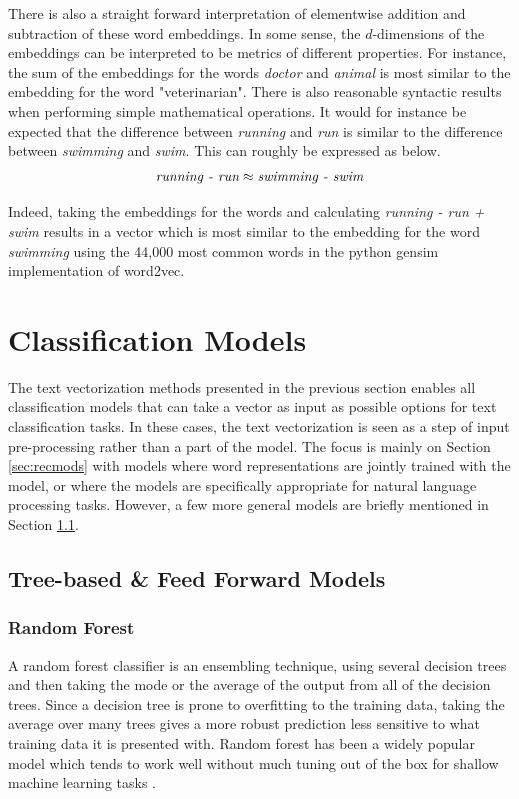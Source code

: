 There is also a straight forward interpretation of elementwise addition and subtraction of these word embeddings. In some sense, the $d$-dimensions of the embeddings can be interpreted to be metrics of different properties. For instance, the sum of the embeddings for the words \emph{doctor} and \emph{animal} is most similar to the embedding for the word "veterinarian". There is also reasonable syntactic results when performing simple mathematical operations. It would for instance be expected that the difference between \emph{running} and \emph{run} is similar to the difference between \emph{swimming} and \emph{swim}. This can roughly be expressed as below. 
\begin{align}
    \emph{running - run} \approx  \emph{swimming - swim}
\end{align}

Indeed, taking the embeddings for the words and calculating \emph{running - run + swim} results in a vector which is most similar to the embedding for the word \emph{swimming} using the 44,000 most common words in the python gensim implementation of word2vec.


\section{Classification Models}

The text vectorization methods presented in the previous section enables all classification models that can take a vector as input as possible options for text classification tasks. In these cases, the text vectorization is seen as a step of input pre-processing rather than a part of the model. The focus is mainly on Section \ref{sec:recmods} with models where word representations are jointly trained with the model, or where the models are specifically appropriate for natural language processing tasks. However, a few more general models are briefly mentioned in Section \ref{sec:treeff}. 

\subsection{Tree-based \& Feed Forward Models}\label{sec:treeff} 

\subsubsection*{Random Forest}

A random forest classifier is an ensembling technique, using several decision trees and then taking the mode or the average of the output from all of the decision trees. Since a decision tree is prone to overfitting to the training data, taking the average over many trees gives a more robust prediction less sensitive to what training data it is presented with. Random forest has been a widely popular model which tends to work well without much tuning out of the box for shallow machine learning tasks \citep{chollet2017deep}. 

